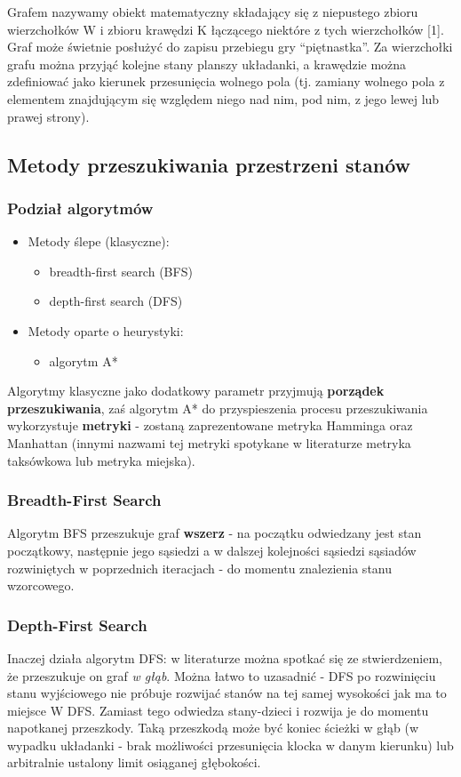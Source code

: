 \documentclass{classrep}
\begin{document}
Grafem nazywamy obiekt matematyczny składający się z niepustego zbioru
wierzchołków W i zbioru krawędzi K łączącego niektóre z tych
wierzchołków {[}1{]}. Graf może świetnie posłużyć do zapisu przebiegu
gry ``piętnastka''. Za wierzchołki grafu można przyjąć kolejne stany
planszy układanki, a krawędzie można zdefiniować jako kierunek
przesunięcia wolnego pola (tj. zamiany wolnego pola z elementem
znajdującym się względem niego nad nim, pod nim, z jego lewej lub prawej
strony).

\subsection{Metody przeszukiwania przestrzeni stanów}
\subsubsection{Podział algorytmów}
\begin{itemize}
  \item Metody ślepe (klasyczne):
    \begin{itemize}
      \item breadth-first search (BFS)
      \item depth-first search (DFS)
    \end{itemize}
  \item Metody oparte o heurystyki:
    \begin{itemize}
      \item algorytm A*
    \end{itemize}
\end{itemize}

Algorytmy klasyczne jako dodatkowy parametr przyjmują \textbf{porządek
przeszukiwania}, zaś algorytm A* do przyspieszenia procesu
przeszukiwania wykorzystuje \textbf{metryki} - zostaną zaprezentowane
metryka Hamminga oraz Manhattan (innymi nazwami tej metryki spotykane
w literaturze metryka taksówkowa lub metryka miejska).

\subsubsection{Breadth-First Search}

Algorytm BFS przeszukuje graf \textbf{wszerz} - na początku
odwiedzany jest stan początkowy, następnie jego sąsiedzi
a w dalszej kolejności sąsiedzi sąsiadów rozwiniętych w poprzednich
iteracjach - do momentu znalezienia stanu wzorcowego.

\subsubsection{Depth-First Search}
Inaczej działa algorytm DFS: w literaturze można spotkać się ze
stwierdzeniem, że przeszukuje on graf \emph{w głąb}. Można łatwo to
uzasadnić - DFS po rozwinięciu stanu wyjściowego nie próbuje rozwijać stanów
na tej samej wysokości jak ma to miejsce W DFS. Zamiast tego odwiedza
stany-dzieci i rozwija je do momentu napotkanej przeszkody. Taką przeszkodą może
być koniec ścieżki w głąb (w wypadku układanki - brak możliwości przesunięcia
klocka w danym kierunku) lub arbitralnie ustalony limit osiąganej głębokości.
\end{document}
